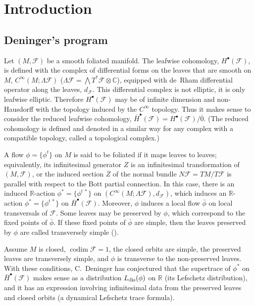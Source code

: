 \documentclass{memo-l}
\theoremstyle{plain}
\theoremstyle{definition}
\theoremstyle{remark}
\newcommand{\C}{\mathbb{C}}
\newcommand{\R}{\mathbb{R}}
\newcommand{\FF}{\mathcal{F}}
\newcommand{\codim}{\operatorname{codim}}
\newcommand{\Ldis}{L_{\text{\rm dis}}}
\numberwithin{section}{chapter}
\numberwithin{equation}{section}%
\begin{document}
\mainmatter

\chapter{Introduction}\label{ch: intro}


\section{Deninger's program}\label{s: Deninger}

Let $(M,\FF)$ be a smooth foliated manifold. The leafwise cohomology, $H^\bullet(\FF)$, is defined with the complex of differential forms on the leaves that are smooth on $M$, $C^\infty(M;\Lambda\FF)$ ($\Lambda\FF=\bigwedge T^*\FF\otimes\C$), equipped with de~Rham differential operator along the leaves, $d_\FF$. This differential complex is not elliptic, it is only leafwise elliptic. Therefore $H^\bullet(\FF)$ may be of infinite dimension and non-Hausdorff with the topology induced by the $C^\infty$ topology. Thus it makes sense to consider the reduced leafwise cohomology, $\bar H^\bullet(\FF)=H^\bullet(\FF)/\overline0$. (The reduced cohomology is defined and denoted in a similar way for any complex with a compatible topology, called a topological complex.)

A flow $\phi=\{\phi^t\}$ on $M$ is said to be foliated if it maps leaves to leaves; equivalently, its infinitesimal generator $Z$ is an infinitesimal transformation of $(M,\FF)$, or the induced section $\overline Z$ of the normal bundle $N\FF=TM/T\FF$ is parallel with respect to the Bott partial connection. In this case, there is an induced $\R$-action $\phi^*=\{\phi^{t\,*}\}$ on $(C^\infty(M;\Lambda\FF),d_\FF)$, which induces an $\R$-action $\phi^*=\{\phi^{t\,*}\}$ on $\bar H^\bullet(\FF)$. Moreover, $\phi$ induces a local flow $\bar\phi$ on local transversals of $\FF$. Some leaves may be preserved by $\phi$, which correspond to the fixed points of $\bar\phi$. If these fixed points of $\bar\phi$ are simple, then the leaves preserved by $\phi$ are called transversely simple ().

Assume $M$ is closed, $\codim\FF=1$, the closed orbits are simple, the preserved leaves are transversely simple, and $\phi$ is transverse to the non-preserved leaves. With these conditions, C.~Deninger has conjectured that the supertrace of $\phi^*$ on $\bar H^\bullet(\FF)$ makes sense as a distribution $\Ldis(\phi)$ on $\R$ (its Lefschetz distribution), and it has an expression involving infinitesimal data from the preserved leaves and closed orbits (a dynamical Lefschetz trace formula).
\end{document}
